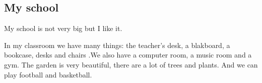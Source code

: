 \subsection*{My school}

My school is not very big but I like it.

In my classroom we have many things: the teacher’s desk, a blakboard, a bookcase, desks and chairs .We also have a computer room, a music room and a gym.
The garden is very beautiful, there are a lot of trees and plants. And we can play football and basketball. 



